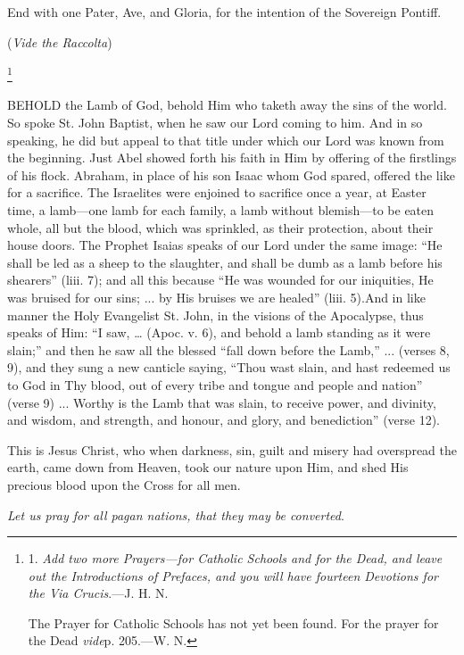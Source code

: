 End with one Pater, Ave, and
Gloria, for the intention of the Sovereign Pontiff.

(\emph{Vide the Raccolta})


\footnote{

1. \emph{Add two more Prayers—for
Catholic Schools and for the Dead, and leave out the Introductions of
Prefaces, and you will have fourteen Devotions for the Via Crucis}.—J.
H. N.

The Prayer for Catholic Schools
has not yet been found. For the prayer for the Dead \emph{vide}p.
205.—W. N.}


BEHOLD the Lamb of
God, behold Him who taketh away the sins of the world. So spoke St. John
Baptist, when he saw our Lord coming to him. And in so speaking, he did
but appeal to that title under which our Lord was known from the
beginning. Just Abel showed forth his faith in Him by offering of the
firstlings of his flock. Abraham, in place of his son Isaac whom God
spared, offered the like for a sacrifice. The Israelites were enjoined
to sacrifice once a year, at Easter time, a lamb—one lamb for each
family, a lamb without blemish—to be eaten whole, all but the blood,
which was sprinkled, as their protection, about their house doors. The
Prophet Isaias speaks of our Lord under the same image: ``He shall
be led as a sheep to the slaughter, and shall be dumb as a lamb before
his shearers'' (liii. 7); and all this because ``He was wounded for our
iniquities, He was bruised for our sins; ... by His bruises we are
healed'' (liii. 5).\emph{}And in like manner the Holy Evangelist St.
John, in the visions of the Apocalypse, thus speaks of Him: ``I saw, …
(Apoc. v. 6), and behold a lamb standing as it were slain;'' and then he
saw all the blessed ``fall down before the Lamb,'' ... (verses 8, 9), and
they sung a new canticle saying, ``Thou wast slain, and hast redeemed us
to God in Thy blood, out of every tribe and tongue and people and nation''
(verse 9) ... Worthy is the Lamb that was slain, to receive power, and
divinity, and wisdom, and strength, and honour, and glory, and
benediction'' (verse 12).

This is Jesus Christ, who when
darkness, sin, guilt and misery had overspread the earth, came down from
Heaven, took our nature upon Him, and shed His precious blood upon the
Cross for all men.

\emph{Let us pray for all pagan
nations, that they may be converted}.

